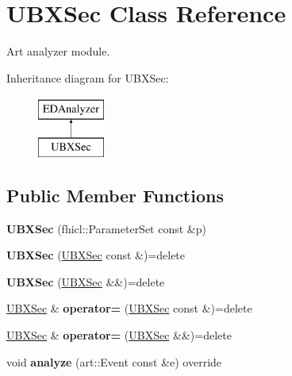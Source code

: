 \hypertarget{classUBXSec}{\section{U\-B\-X\-Sec Class Reference}
\label{classUBXSec}
}


Art analyzer module.  


Inheritance diagram for U\-B\-X\-Sec\-:\begin{figure}[H]
\begin{center}
\leavevmode
\includegraphics[height=2.000000cm]{classUBXSec}
\end{center}
\end{figure}
\subsection*{Public Member Functions}
\begin{DoxyCompactItemize}
\item 
\hypertarget{classUBXSec_a002d19d94378dc90587c10bd4b498c4b}{{\bfseries U\-B\-X\-Sec} (fhicl\-::\-Parameter\-Set const \&p)}\label{classUBXSec_a002d19d94378dc90587c10bd4b498c4b}

\item 
\hypertarget{classUBXSec_a7605dc6971daa3828fc2cc98b118ad35}{{\bfseries U\-B\-X\-Sec} (\hyperlink{classUBXSec}{U\-B\-X\-Sec} const \&)=delete}\label{classUBXSec_a7605dc6971daa3828fc2cc98b118ad35}

\item 
\hypertarget{classUBXSec_ac34a81c60372754002552bff0c9a2764}{{\bfseries U\-B\-X\-Sec} (\hyperlink{classUBXSec}{U\-B\-X\-Sec} \&\&)=delete}\label{classUBXSec_ac34a81c60372754002552bff0c9a2764}

\item 
\hypertarget{classUBXSec_a77d35a5e1f8ddd85190e0c78bb125229}{\hyperlink{classUBXSec}{U\-B\-X\-Sec} \& {\bfseries operator=} (\hyperlink{classUBXSec}{U\-B\-X\-Sec} const \&)=delete}\label{classUBXSec_a77d35a5e1f8ddd85190e0c78bb125229}

\item 
\hypertarget{classUBXSec_aa8449ecf97b4c738a60b714dd0ea181e}{\hyperlink{classUBXSec}{U\-B\-X\-Sec} \& {\bfseries operator=} (\hyperlink{classUBXSec}{U\-B\-X\-Sec} \&\&)=delete}\label{classUBXSec_aa8449ecf97b4c738a60b714dd0ea181e}

\item 
\hypertarget{classUBXSec_a30a2981a63a32be7d7b8819bb462e859}{void {\bfseries analyze} (art\-::\-Event const \&e) override}\label{classUBXSec_a30a2981a63a32be7d7b8819bb462e859}

\end{DoxyCompactItemize}


